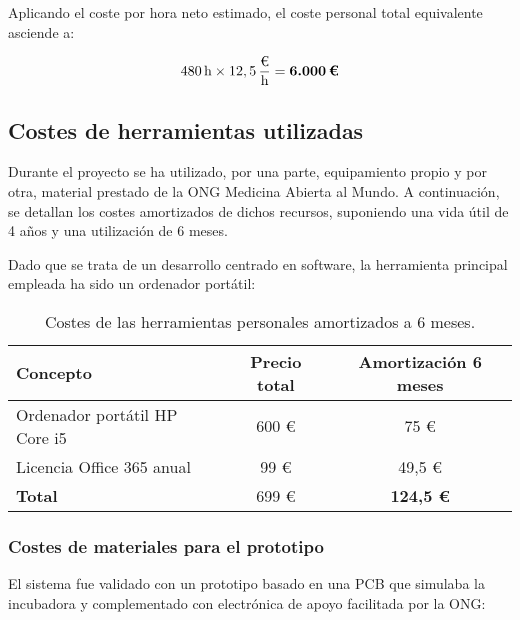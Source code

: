 Aplicando el coste por hora neto estimado, el coste personal total equivalente asciende a:

\[
480 \, \text{h} \times 12,5\, \frac{\text{€}}{\text{h}} = \textbf{6.000\,€}
\]


\subsection{Costes de herramientas utilizadas}

Durante el proyecto se ha utilizado, por una parte, equipamiento propio y por otra, material prestado de la ONG Medicina Abierta al Mundo.  A continuación, se detallan los costes amortizados de dichos recursos, suponiendo una vida útil de 4 años y una utilización de 6 meses.

Dado que se trata de un desarrollo centrado en software, la herramienta principal empleada ha sido un ordenador portátil:

\begin{table}[H]
\centering
\begin{tabular}{|l|c|c|}
\hline
\textbf{Concepto} & \textbf{Precio total} & \textbf{Amortización 6 meses} \\
\hline
Ordenador portátil HP Core i5 & 600 €\footnotemark[1] & 75 € \\
Licencia Office 365 anual & 99 €\footnotemark[2] & 49,5 € \\
\hline
\textbf{Total} & 699 € & \textbf{124,5 €} \\
\hline
\end{tabular}
\caption{Costes de las herramientas personales amortizados a 6 meses.}
\label{tab:costes-amortizados}
\end{table}






\subsubsection{Costes de materiales para el prototipo}

El sistema fue validado con un prototipo basado en una PCB que simulaba la incubadora y complementado con electrónica de apoyo  facilitada por la ONG:

